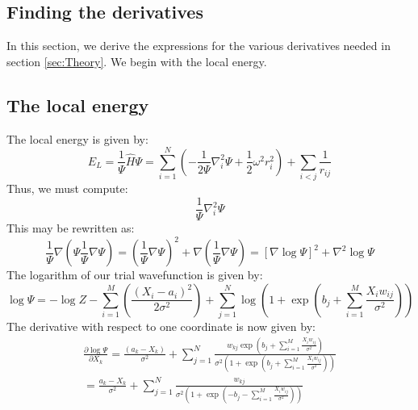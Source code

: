 \documentclass[a4paper, 10pt]{article}
\begin{document}
	\begin{appendices}
	\section{Finding the derivatives}\label{ap:finding_derivatives}
	In this section, we derive the expressions for the various derivatives needed in section \ref{sec:Theory}. We begin with the local energy.
	\subsection{The local energy}\label{ap:local_energy}
	The local energy is given by:
	\begin{equation}\label{eq:ap_local_energy}
	E_L=\frac{1}{\Psi}\hat{H}\Psi= \sum_{i=1}^N \left(-\frac{1}{2\Psi}\nabla_i^2 \Psi + \frac{1}{2}\omega^2 r_i^2\right)+\sum_{i<j} \frac{1}{r_{ij}}
	\end{equation}
	Thus, we must compute:
	\begin{equation}
	\frac{1}{\Psi}\nabla_i^2 \Psi
	\end{equation}
	This may be rewritten as:
	\begin{equation}\label{eq:log_expression_for_trial_wavefunction}
	\frac{1}{\Psi}\nabla \left(\Psi \frac{1}{\Psi} \nabla\Psi\right)=\left(\frac{1}{\Psi}\nabla \Psi\right)^2+\nabla \left(\frac{1}{\Psi}\nabla \Psi \right)=\left[\nabla \log \Psi\right]^2 + \nabla^2 \log \Psi
	\end{equation}
	The logarithm of our trial wavefunction is given by:
	\begin{equation}\label{eq:logarithm_of_wavefunction}
	\log \Psi = -\log Z -\sum_{i=1}^M \left(\frac{(X_i-a_i)^2}{2\sigma^2}\right)+\sum_{j=1}^N \log \left(1+\exp \left(b_j+\sum_{i=1}^{M} \frac{X_iw_{ij}}{\sigma^2}\right)\right)
	\end{equation}
	The derivative with respect to one coordinate is now given by:
	\begin{equation}\label{eq:first_derivative_log_psi}
	\begin{split}
	\frac{\partial \log \Psi}{\partial X_k}=\frac{(a_k-X_k)}{\sigma^2}+\sum_{j=1}^N \frac{w_{kj} \exp \left(b_j+\sum_{i=1}^{M} \frac{X_iw_{ij}}{\sigma^2}\right)}{\sigma^2 \left(1+\exp \left(b_j+\sum_{i=1}^{M} \frac{X_iw_{ij}}{\sigma^2}\right)\right)}\\
	=\frac{a_k-X_k}{\sigma^2}+\sum_{j=1}^N \frac{w_{kj}}{\sigma^2 \left(1+ \exp \left(-b_j-\sum_{i=1}^{M} \frac{X_iw_{ij}}{\sigma^2}\right)\right)}
	\end{split}

\end{equation}
\end{appendices}
\end{document}
